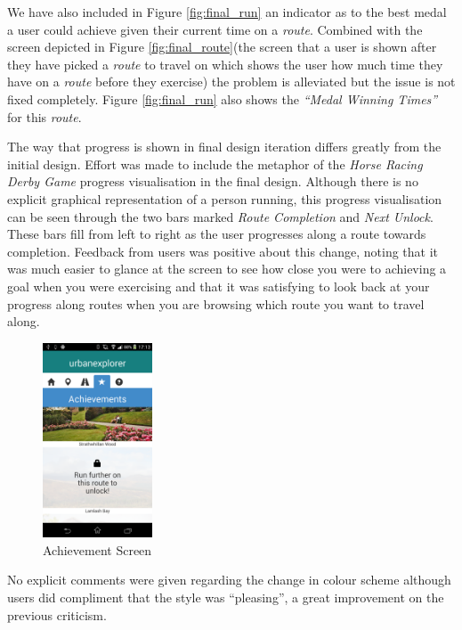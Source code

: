 We have also included in Figure \ref{fig:final_run} an indicator as to
the best medal a user could achieve given their current time on a
\emph{route}. Combined with the screen depicted in Figure
\ref{fig:final_route}(the screen that a user is shown after they have 
picked a \emph{route} to travel on which shows the user how much time
they have on a \emph{route} before they exercise) the problem is
alleviated but the issue is not fixed completely. Figure
\ref{fig:final_run} also shows the \emph{``Medal Winning Times''}
for this \emph{route}.

The way that progress is shown in final design iteration differs
greatly from the initial design. Effort was made to include the
metaphor of the \emph{Horse Racing Derby Game} progress visualisation
in the final design. Although there is no explicit graphical
representation of a person running, this progress visualisation can be
seen through the two bars marked \emph{Route Completion} and
\emph{Next Unlock}. These bars fill from left to right as the user
progresses along a route towards completion. Feedback from users was
positive about this change, noting that it was much easier to glance
at the screen to see how close you were to achieving a goal when you
were exercising and that it was satisfying to look back at your
progress along routes when you are browsing which route you want to
travel along. 

\begin{figure}
  \vspace{15pt}
  \centering
  \includegraphics[width=0.29\textwidth]{images/screens/ach_2.png}
  \vspace{-20pt}
  \caption{Achievement Screen}
  \vspace{-25pt}
  \label{fig:final_ach}
\end{figure}

No explicit comments were given regarding the change in colour scheme
although users did compliment that the style was ``pleasing'', a great
improvement on the previous criticism. 

